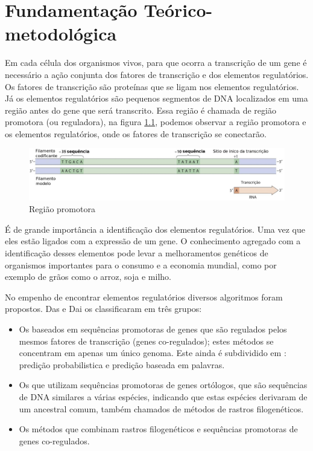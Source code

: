 \chapter{Fundamentação Teórico-metodológica}

Em cada célula dos organismos vivos, para que ocorra a transcrição de um gene é necessário a ação conjunta dos fatores de transcrição e dos elementos regulatórios. Os fatores de transcrição são proteínas que se ligam nos elementos regulatórios. Já os elementos regulatórios são pequenos segmentos de DNA localizados em uma região antes do gene que será transcrito. Essa região é chamada de região promotora (ou reguladora), na figura \ref{fig:promotores_noDNA}, podemos observar a região promotora e os elementos regulatórios, onde os fatores de transcrição se conectarão.

\begin{figure}[htb!]
    \centering
    \includegraphics[scale=0.7]{./imagens/promotores_noDNA.jpg}
    \caption{Região promotora}
    \label{fig:promotores_noDNA}
\end{figure}

É de grande importância a identificação dos elementos regulatórios. Uma vez que eles estão ligados com a expressão de um gene. O conhecimento agregado com a identificação desses elementos pode levar a melhoramentos genéticos de organismos importantes para o consumo e a economia mundial, como por exemplo de grãos como o arroz, soja e milho.

No empenho de encontrar elementos regulatórios diversos algoritmos foram propostos. Das e Dai \cite{Das2007} os classificaram em três grupos:

\begin{itemize}
\item Os baseados em sequências promotoras de genes que são regulados pelos mesmos fatores de transcrição (genes co-regulados); estes métodos se concentram em apenas um único genoma.
\subitem Este ainda é subdividido em : predição probabilistica e predição baseada em palavras.

\item Os que utilizam sequências promotoras de genes ortólogos, que são sequências de DNA similares a várias espécies, indicando que estas espécies derivaram de um ancestral comum, também chamados de métodos de rastros filogenéticos.

\item Os métodos que combinam rastros filogenéticos e sequências promotoras de genes co-regulados.
\end{itemize}

